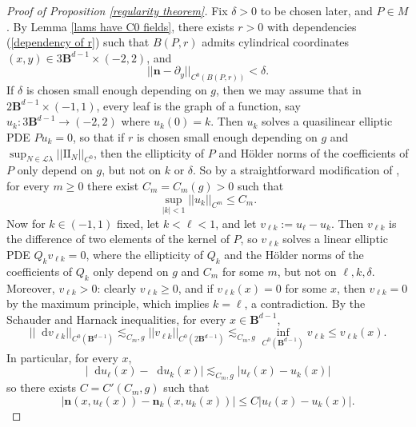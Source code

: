 \documentclass[reqno,11pt]{amsart}
\newcommand{\Ball}{\mathbf{B}}
\newcommand*\dif{\mathop{}\!\mathrm{d}}
\newcommand{\Leaves}{\mathscr L}
\newcommand{\Two}{\mathrm{I\!I}}
\newcommand{\normal}{\mathbf n}
\theoremstyle{definition}
\numberwithin{equation}{section}
\begin{document}
\begin{proof}[Proof of Proposition \ref{regularity theorem}]
Fix $\delta > 0$ to be chosen later, and $P \in M$.
By Lemma \ref{lams have C0 fields}, there exists $r > 0$ with dependencies (\ref{dependency of r}) such that $B(P, r)$ admits cylindrical coordinates $(x, y) \in 3\Ball^{d - 1} \times (-2, 2)$, and
\begin{equation}\label{normal is almost constant}
||\normal - \partial_y||_{C^0(B(P, r))} < \delta.
\end{equation}
If $\delta$ is chosen small enough depending on $g$, then we may assume that in $2\Ball^{d - 1} \times (-1, 1)$,
every leaf is the graph of a function, say $u_k: 3\Ball^{d - 1} \to (-2, 2)$ where $u_k(0) = k$.
Then $u_k$ solves a quasilinear elliptic PDE $Pu_k = 0$, so that if $r$ is chosen small enough depending on $g$ and $\sup_{N \in \Leaves \lambda} ||\Two_N||_{C^0}$, then the ellipticity of $P$ and H\"older norms of the coefficients of $P$ only depend on $g$, but not on $k$ or $\delta$.
So by a straightforward modification of \cite[Corollary 16.7]{gilbarg2015elliptic}, for every $m \geq 0$ there exist $C_m = C_m(g) > 0$ such that
\begin{equation}\label{norms on uk}
\sup_{|k| < 1} ||u_k||_{C^m} \leq C_m.
\end{equation}
Now for $k \in (-1, 1)$ fixed, let $k < \ell < 1$, and let $v_{\ell k} := u_\ell - u_k$.
Then $v_{\ell k}$ is the difference of two elements of the kernel of $P$, so $v_{\ell k}$ solves a linear elliptic PDE $Q_k v_{\ell k} = 0$, where the ellipticity of $Q_k$ and the H\"older norms of the coefficients of $Q_k$ only depend on $g$ and $C_m$ for some $m$, but not on $\ell, k, \delta$.
Moreover, $v_{\ell k} > 0$: clearly $v_{\ell k} \geq 0$, and if $v_{\ell k}(x) = 0$ for some $x$, then $v_{\ell k} = 0$ by the maximum principle, which implies $k = \ell$, a contradiction.
By the Schauder \cite[Theorem 6.2]{gilbarg2015elliptic} and Harnack \cite[Theorem 9.25]{gilbarg2015elliptic} inequalities, for every $x \in \Ball^{d - 1}$,
\begin{equation}\label{Schauder Harnack}
	||\dif v_{\ell k}||_{C^0(\Ball^{d - 1})} \lesssim_{C_m, g} ||v_{\ell k}||_{C^0(2 \Ball^{d - 1})} \lesssim_{C_m, g} \inf_{C^0(\Ball^{d - 1})} v_{\ell k} \leq v_{\ell k}(x).
\end{equation}
In particular, for every $x$,
$$|\dif u_\ell(x) - \dif u_k(x)| \lesssim_{C_m, g} |u_\ell(x) - u_k(x)|$$
so there exists $C = C'(C_m, g)$ such that
\begin{equation}\label{vertical Lipschitz}
|\normal(x, u_\ell(x)) - \normal_k(x, u_k(x))| \leq C |u_\ell(x) - u_k(x)|.
\end{equation}


\end{proof}
\end{document}
